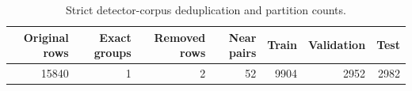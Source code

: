 \begin{table}
\caption{Strict detector-corpus deduplication and partition counts.}
\label{tab:v3_dedup}
\begin{tabular}{rrrrrrr}
\toprule
Original rows & Exact groups & Removed rows & Near pairs & Train & Validation & Test \\
\midrule
15840 & 1 & 2 & 52 & 9904 & 2952 & 2982 \\
\bottomrule
\end{tabular}
\end{table}
